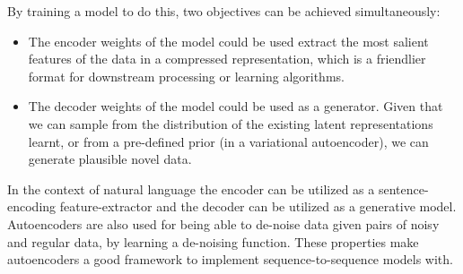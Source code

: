 By training a model to do this, two objectives can be achieved simultaneously:
\begin{itemize}
	\item The encoder weights of the model could be used extract the most salient features of the data in a compressed representation, which is a friendlier format for downstream processing or learning algorithms. \citep{hinton2006reducing}
	\item The decoder weights of the model could be used as a generator. Given that we can sample from the distribution of the existing latent representations learnt, or from a pre-defined prior (in a variational autoencoder), we can generate plausible novel data.
\end{itemize}

In the context of natural language the encoder can be utilized as a sentence-encoding feature-extractor and the decoder can be utilized as a generative model. Autoencoders are also used for being able to de-noise data given pairs of noisy and regular data, by learning a de-noising function. These properties make autoencoders a good framework to implement sequence-to-sequence models with.
